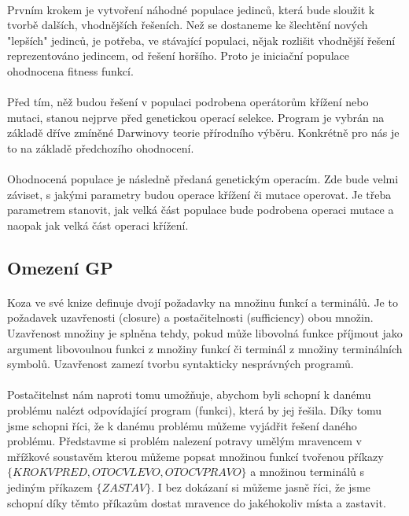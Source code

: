 \documentclass[bc,male,java,dept460]{diploma}		%
\begin{document}
\paragraph*{}
Prvním krokem je vytvoření náhodné populace jedinců, která bude sloužit k tvorbě dalších, vhodnějších řešeních.
Než se dostaneme ke šlechtění nových "lepších" jedinců, je potřeba, ve stávající populaci, nějak rozlišit vhodnější řešení reprezentováno jedincem, od řešení horšího. Proto je iniciační populace ohodnocena fitness funkcí.

\paragraph*{}
Před tím, něž budou řešení v populaci podrobena operátorům křížení nebo mutaci, stanou nejprve před genetickou operací selekce. Program je vybrán na základě dříve zmíněné Darwinovy teorie přírodního výběru. Konkrétně pro nás je to na základě předchozího ohodnocení.

\paragraph*{}
Ohodnocená populace je následně předaná genetickým operacím. Zde bude velmi záviset, s jakými parametry budou operace křížení či mutace operovat. Je třeba parametrem stanovit, jak velká část populace bude podrobena operaci mutace a naopak jak velká část operaci křížení. 

\subsection{Omezení GP}
\paragraph*{}
Koza ve své knize definuje \cite{kozagp} dvojí požadavky na množinu funkcí a terminálů. Je to požadavek uzavřenosti (closure) a postačitelnosti (sufficiency) obou množin. Uzavřenost množiny je splněna tehdy, pokud může libovolná funkce příjmout jako argument libovoulnou funkci z množiny funkcí či terminál z množiny terminálních symbolů. Uzavřenost zamezí tvorbu syntakticky nesprávných programů.

\paragraph*{}
Postačitelnst nám naproti tomu umožňuje, abychom byli schopní k danému problému nalézt odpovídající program (funkci), která by jej řešila. Díky tomu jsme schopni říci, že k danému problému můžeme vyjádřit řešení daného problému. Představme si problém nalezení potravy umělým mravencem v mřížkové soustavěm kterou můžeme popsat množinou funkcí tvořenou příkazy $\{KROK VPRED, OTOC VLEVO, OTOC VPRAVO\}$ a množinou terminálů s jediným příkazem $\{ZASTAV\}$. I bez dokázaní si můžeme jasně říci, že jsme schopní díky těmto příkazům dostat mravence do jakéhokoliv místa a zastavit.
\end{document}
